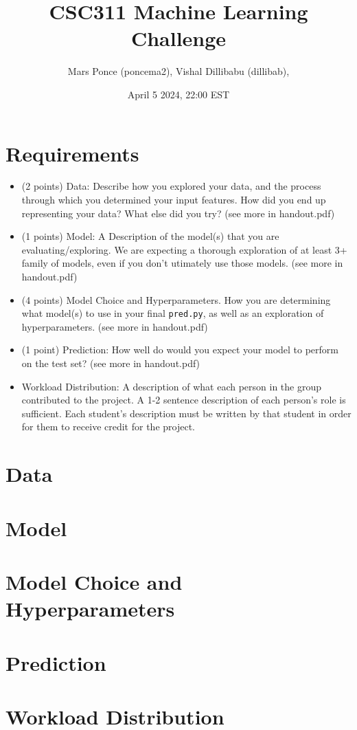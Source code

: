 \documentclass{article}
\title{CSC311 Machine Learning Challenge}
\author{Mars Ponce (poncema2), Vishal Dillibabu (dillibab), } %
\date{April 5 2024, 22:00 EST}
\begin{document}
\maketitle

\newpage

\section*{Requirements}
\begin{itemize}
	\item (2 points) Data: Describe how you explored your data, and the process through which you determined your input features. How did you end up representing your data? What else did you try? (see more in handout.pdf)
	\item (1 points) Model: A Description of the model(s) that you are evaluating/exploring. We are expecting a thorough exploration of at least 3+ family of models, even if you don't utimately use those models. (see more in handout.pdf) 
	\item (4 points) Model Choice and Hyperparameters. How you are determining what model(s) to use in your final \verb|pred.py|, as well as an exploration of hyperparameters. (see more in handout.pdf)
	\item (1 point) Prediction: How well do would you expect your model to perform on the test set? (see more in handout.pdf)
	\item Workload Distribution: A description of what each person in the group contributed to the project. A 1-2 sentence description of each person’s role is sufficient. Each student’s description must be written by that student in order for them to receive credit for the project.
\end{itemize}

\section{Data}

\section{Model}

\section{Model Choice and Hyperparameters}

\section{Prediction}

\section{Workload Distribution}
\end{document}
